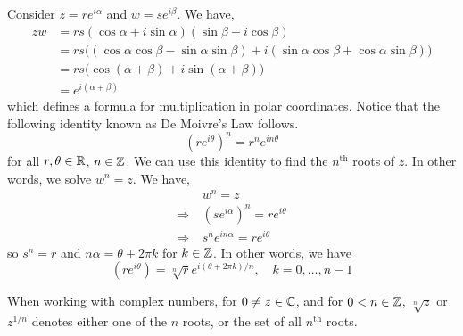 \documentclass[11pt]{article}
\begin{document}
Consider $z = re^{i\alpha}$ and $w = se^{i\beta}$. We have,
\begin{align*}
zw &= rs(\cos\alpha + i\sin\alpha)(\sin\beta + i\cos\beta)\\
&= rs\big((\cos\alpha\cos\beta-\sin\alpha \sin\beta) +
i(\sin\alpha\cos\beta+\cos\alpha\sin\beta)\big)\\
&= rs\big(\cos(\alpha + \beta) + i\sin(\alpha + \beta)\big)\\
&= e^{i(\alpha + \beta)}
\end{align*}
which defines a formula for multiplication in polar coordinates. Notice that the
following identity known as De Moivre's Law follows.
\begin{equation*}
(re^{i\theta})^n = r^ne^{in\theta}
\end{equation*}
for all $r,\theta \in \mathbb{R}$, $n \in \mathbb{Z}$. We can use this identity to find the
$n^\text{th}$ roots of $z$. In other words, we solve $w^n = z$. We have,
\begin{align*}
&\> w^n = z\\
\Rightarrow & \> (se^{i\alpha})^n = re^{i\theta}\\
\Rightarrow & \> s^ne^{in\alpha} = re^{i\theta}
\end{align*}
so $s^n = r$ and $n\alpha = \theta + 2\pi k$ for $k \in \mathbb{Z}$. In other words, we
have
\begin{equation*}
(re^{i\theta}) = \sqrt[n]r e^{i(\theta + 2\pi k )/n}, \quad k = 0,\dots,n-1
\end{equation*}
\begin{remark}
When working with complex numbers, for $0 \neq z \in \mathbb{C}$, and for $0 < n \in
\mathbb{Z}$, $\sqrt[n]z$ or $z^{1/n}$ denotes either one of the $n$ roots, or the set of
all $n^{\text{th}}$ roots.
\end{remark}
\end{document}
